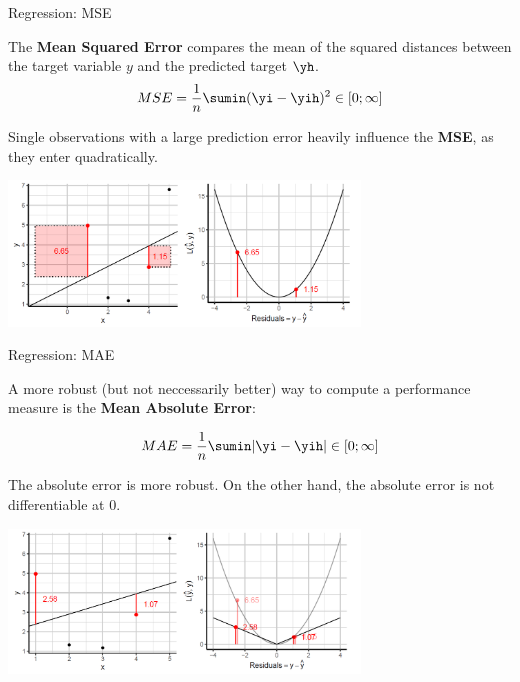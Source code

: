 \begin{frame}{Regression: MSE}

The \textbf{Mean Squared Error} compares the mean of the squared
distances between the target variable \(y\) and the predicted target
\(\yh\). \[
MSE = \frac{1}{n} \sumin (\yi - \yih)^2 \in [0;\infty]
\]

Single observations with a large prediction error heavily influence the
\textbf{MSE}, as they enter quadratically.

\scriptsize

\begin{center}
\includegraphics[width=0.7\textwidth]{plots/MSE.png}
\end{center}

\normalsize 

\end{frame}

\begin{frame}{Regression: MAE}

A more robust (but not neccessarily better) way to compute a performance
measure is the \textbf{Mean Absolute Error}:

\[
MAE = \frac{1}{n} \sumin |\yi - \yih| \in [0;\infty]
\]

The absolute error is more robust. On the other hand, the absolute error
is not differentiable at \(0\).

\scriptsize

\begin{center}
\includegraphics[width=0.7\textwidth]{plots/MAE.png}
\end{center}

\normalsize 

\end{frame}

